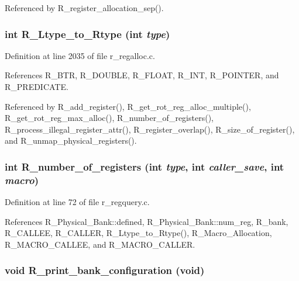 Referenced by R\_\-register\_\-allocation\_\-sep().
\subsubsection{\setlength{\rightskip}{0pt plus 5cm}int R\_\-Ltype\_\-to\_\-Rtype (int {\em type})}\label{r__regproto_8h_d1bd8108e1f3ba8e661eecbaa540e5e5}




Definition at line 2035 of file r\_\-regalloc.c.

References R\_\-BTR, R\_\-DOUBLE, R\_\-FLOAT, R\_\-INT, R\_\-POINTER, and R\_\-PREDICATE.

Referenced by R\_\-add\_\-register(), R\_\-get\_\-rot\_\-reg\_\-alloc\_\-multiple(), R\_\-get\_\-rot\_\-reg\_\-max\_\-alloc(), R\_\-number\_\-of\_\-registers(), R\_\-process\_\-illegal\_\-register\_\-attr(), R\_\-register\_\-overlap(), R\_\-size\_\-of\_\-register(), and R\_\-unmap\_\-physical\_\-registers().
\subsubsection{\setlength{\rightskip}{0pt plus 5cm}int R\_\-number\_\-of\_\-registers (int {\em type}, int {\em caller\_\-save}, int {\em macro})}\label{r__regproto_8h_fe09737d3ae741f7b797fec592c32fd9}




Definition at line 72 of file r\_\-regquery.c.

References R\_\-Physical\_\-Bank::defined, R\_\-Physical\_\-Bank::num\_\-reg, R\_\-bank, R\_\-CALLEE, R\_\-CALLER, R\_\-Ltype\_\-to\_\-Rtype(), R\_\-Macro\_\-Allocation, R\_\-MACRO\_\-CALLEE, and R\_\-MACRO\_\-CALLER.
\subsubsection{\setlength{\rightskip}{0pt plus 5cm}void R\_\-print\_\-bank\_\-configuration (void)}\label{r__regproto_8h_9818f92db8b727292ec990c7547adef6}




